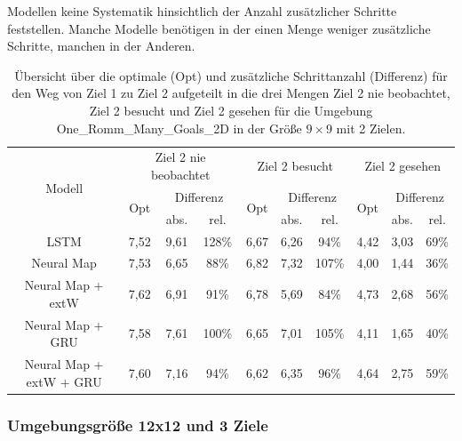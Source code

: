 Modellen keine Systematik hinsichtlich der Anzahl zusätzlicher Schritte feststellen. Manche Modelle benötigen in der einen Menge weniger zusätzliche Schritte, manchen in der Anderen.

\begin{table}
  \begin{tabular}{|c|c|c|c|c|c|c|c|c|c|}
    \hline
    \multirow{3}{*}{Modell} & \multicolumn{3}{|c|}{Ziel 2 nie beobachtet} & \multicolumn{3}{|c|}{Ziel 2 besucht} & \multicolumn{3}{|c|}{Ziel 2 gesehen} \\ \cline{2-10}
    & \multirow{2}{*}{Opt} & \multicolumn{2}{|c|}{Differenz} & \multirow{2}{*}{Opt} & \multicolumn{2}{|c|}{Differenz} & \multirow{2}{*}{Opt} & \multicolumn{2}{|c|}{Differenz} \\ \cline{3-4} \cline{6-7} \cline{9-10}
    & & abs. & rel. & & abs. & rel. & & abs. & rel. \\ \hline
    LSTM & 7,52 & 9,61 & 128\% & 6,67 & 6,26 & 94\% & 4,42 & 3,03 & 69\% \\ \hline
    Neural Map & 7,53 & 6,65 & 88\% & 6,82 & 7,32 & 107\% & 4,00 & 1,44 & 36\% \\ \hline
    Neural Map + extW & 7,62 & 6,91 & 91\% & 6,78 & 5,69 & 84\% & 4,73 & 2,68 & 56\% \\ \hline
    Neural Map + GRU & 7,58 & 7,61 & 100\% & 6,65 & 7,01 & 105\% & 4,11 & 1,65 & 40\% \\ \hline
    Neural Map + extW + GRU & 7,60 & 7,16 & 94\% & 6,62 & 6,35 & 96\% & 4,64 & 2,75 & 59\% \\ \hline
  \end{tabular}
  \caption{Übersicht über die optimale (Opt) und zusätzliche Schrittanzahl (Differenz) für den Weg von Ziel 1 zu Ziel 2 aufgeteilt in die drei Mengen \glqq Ziel 2 nie beobachtet\grqq{}, \glqq Ziel 2 besucht\grqq{} und \glqq Ziel 2 gesehen\grqq{} für die Umgebung \glqq One\_Romm\_Many\_Goals\_2D\grqq{} in der Größe $9 \times 9$ mit 2 Zielen.}
  \label{results9x9_1_to_2_per_M}
\end{table}


\subsubsection{Umgebungsgröße 12x12 und 3 Ziele}

